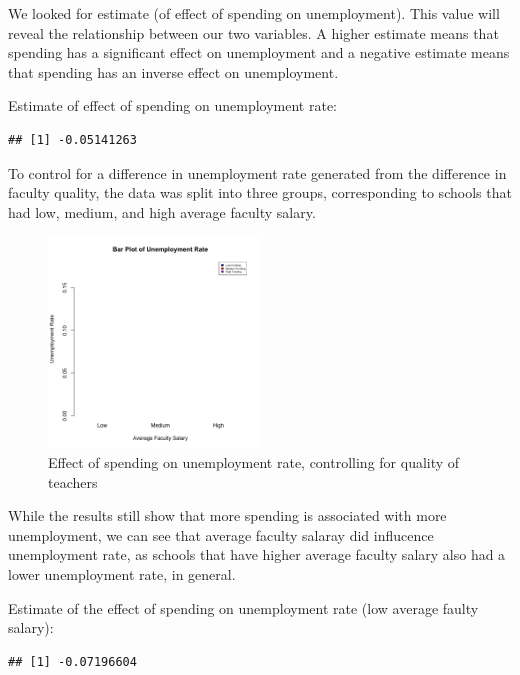 \documentclass{article}\usepackage[]{graphicx}\usepackage[]{color}
\makeatletter
\newenvironment{kframe}{%
 \def\at@end@of@kframe{}%
 \ifinner\ifhmode%
  \def\at@end@of@kframe{\end{minipage}}%
  \begin{minipage}{\columnwidth}%
 \fi\fi%
 \def\FrameCommand##1{\hskip\@totalleftmargin \hskip-\fboxsep
 \colorbox{shadecolor}{##1}\hskip-\fboxsep
     \hskip-\linewidth \hskip-\@totalleftmargin \hskip\columnwidth}%
 \MakeFramed {\advance\hsize-\width
   \@totalleftmargin\z@ \linewidth\hsize
   \@setminipage}}%
 {\par\unskip\endMakeFramed%
 \at@end@of@kframe}
\newenvironment{knitrout}{}{} %
\makeatother
\begin{document}
We looked for estimate (of effect of spending on unemployment). This value will reveal the relationship between our two variables.  A higher estimate means that spending has a significant effect on unemployment and a negative estimate means that spending has an inverse effect on unemployment.

Estimate of effect of spending on unemployment rate:
\begin{knitrout}
\color{fgcolor}\begin{kframe}
\begin{verbatim}
## [1] -0.05141263
\end{verbatim}
\end{kframe}
\end{knitrout}

To control for a difference in unemployment rate generated from the difference in faculty quality, the data was split into three groups, corresponding to schools that had low, medium, and high average faculty salary.  


\graphicspath{ {../../images/} }
\begin{figure}
\centering
\includegraphics[width=0.5\textwidth]{funding}
\caption{Effect of spending on unemployment rate, controlling for quality of teachers}
\end{figure}


While the results still show that more spending is associated with more unemployment, we can see that average faculty salaray did influcence unemployment rate, as schools that have higher average faculty salary also had a lower unemployment rate, in general. 

Estimate of the effect of spending on unemployment rate (low average faulty salary):
\begin{knitrout}
\color{fgcolor}\begin{kframe}
\begin{verbatim}
## [1] -0.07196604
\end{verbatim}
\end{kframe}
\end{knitrout}
\end{document}
